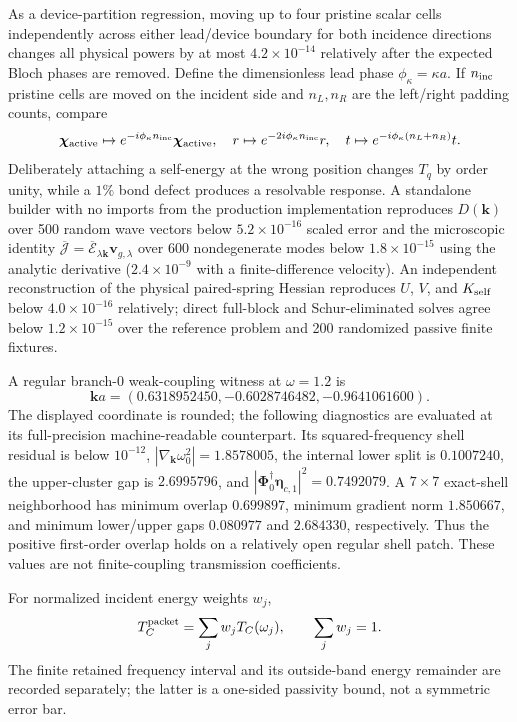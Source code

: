 \documentclass[10pt,aps,pre,onecolumn,notitlepage,nofootinbib]{revtex4-2}
\newcommand{\vk}{\bm k}
\newcommand{\veta}{\bm\eta}
\newcommand{\vchi}{\bm\chi}
\begin{document}
As a device-partition regression, moving up to four pristine scalar cells independently across either lead/device boundary for both incidence directions changes all physical powers by at most $4.2\times10^{-14}$ relatively after the expected Bloch phases are removed. Define the dimensionless lead phase $\phi_\kappa=\kappa a$. If $n_{\rm inc}$ pristine cells are moved on the incident side and $n_L,n_R$ are the left/right padding counts, compare
\begin{equation}
 \vchi_{\rm active}\mapsto e^{-i\phi_\kappa n_{\rm inc}}\vchi_{\rm active},
 \quad r\mapsto e^{-2i\phi_\kappa n_{\rm inc}}r,
 \quad t\mapsto e^{-i\phi_\kappa(n_L+n_R)}t.
\end{equation} Deliberately attaching a self-energy at the wrong position changes $T_q$ by order unity, while a $1\%$ bond defect produces a resolvable response. A standalone builder with no imports from the production implementation reproduces $D(\vk)$ over 500 random wave vectors below $5.2\times10^{-16}$ scaled error and the microscopic identity $\overline{\bm{\mathcal J}}=\overline{\mathcal E}_{\lambda\bm k}\bm v_{g,\lambda}$ over 600 nondegenerate modes below $1.8\times10^{-15}$ using the analytic derivative ($2.4\times10^{-9}$ with a finite-difference velocity). An independent reconstruction of the physical paired-spring Hessian reproduces $U$, $V$, and $K_{\rm self}$ below $4.0\times10^{-16}$ relatively; direct full-block and Schur-eliminated solves agree below $1.2\times10^{-15}$ over the reference problem and 200 randomized passive finite fixtures.

A regular branch-0 weak-coupling witness at $\omega=1.2$ is
\begin{equation}
 \bm k a=(0.6318952450,-0.6028746482,-0.9641061600).
\end{equation}
The displayed coordinate is rounded; the following diagnostics are evaluated at its full-precision machine-readable counterpart. Its squared-frequency shell residual is below $10^{-12}$, $|\nabla_{\bm k}\omega_0^2|=1.8578005$, the internal lower split is $0.1007240$, the upper-cluster gap is $2.6995796$, and $|\bm\Phi_0^\dagger\veta_{c,1}|^2=0.7492079$. A $7\times7$ exact-shell neighborhood has minimum overlap $0.699897$, minimum gradient norm $1.850667$, and minimum lower/upper gaps $0.080977$ and $2.684330$, respectively. Thus the positive first-order overlap holds on a relatively open regular shell patch. These values are not finite-coupling transmission coefficients.

For normalized incident energy weights $w_j$,
\begin{equation}
 T_C^{\rm packet}=\sum_jw_jT_C(\omega_j),
 \qquad \sum_jw_j=1.
\end{equation}
The finite retained frequency interval and its outside-band energy remainder are recorded separately; the latter is a one-sided passivity bound, not a symmetric error bar.
\end{document}
